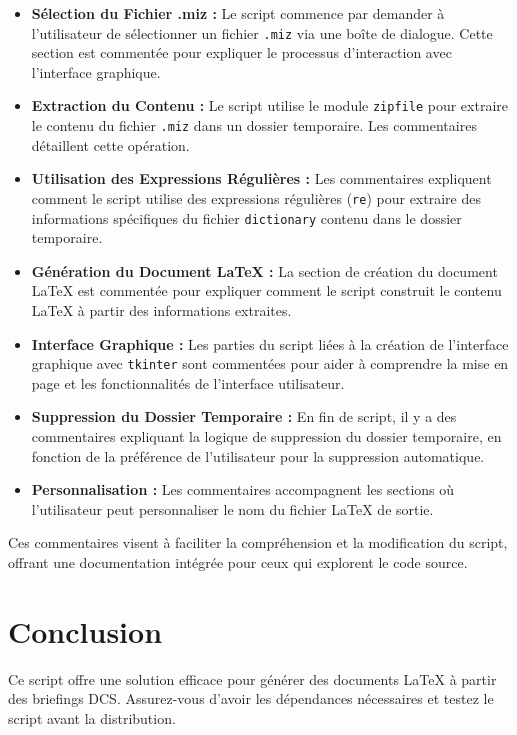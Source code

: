 \documentclass{article}
\begin{document}
\begin{itemize}
    \item \textbf{Sélection du Fichier .miz :} Le script commence par demander à l'utilisateur de sélectionner un fichier \texttt{.miz} via une boîte de dialogue. Cette section est commentée pour expliquer le processus d'interaction avec l'interface graphique.

    \item \textbf{Extraction du Contenu :} Le script utilise le module \texttt{zipfile} pour extraire le contenu du fichier \texttt{.miz} dans un dossier temporaire. Les commentaires détaillent cette opération.

    \item \textbf{Utilisation des Expressions Régulières :} Les commentaires expliquent comment le script utilise des expressions régulières (\texttt{re}) pour extraire des informations spécifiques du fichier \texttt{dictionary} contenu dans le dossier temporaire.

    \item \textbf{Génération du Document LaTeX :} La section de création du document LaTeX est commentée pour expliquer comment le script construit le contenu LaTeX à partir des informations extraites.

    \item \textbf{Interface Graphique :} Les parties du script liées à la création de l'interface graphique avec \texttt{tkinter} sont commentées pour aider à comprendre la mise en page et les fonctionnalités de l'interface utilisateur.

    \item \textbf{Suppression du Dossier Temporaire :} En fin de script, il y a des commentaires expliquant la logique de suppression du dossier temporaire, en fonction de la préférence de l'utilisateur pour la suppression automatique.

    \item \textbf{Personnalisation :} Les commentaires accompagnent les sections où l'utilisateur peut personnaliser le nom du fichier LaTeX de sortie.

\end{itemize}

Ces commentaires visent à faciliter la compréhension et la modification du script, offrant une documentation intégrée pour ceux qui explorent le code source.

\section{Conclusion}
Ce script offre une solution efficace pour générer des documents LaTeX à partir des briefings DCS. Assurez-vous d'avoir les dépendances nécessaires et testez le script avant la distribution.
\end{document}
